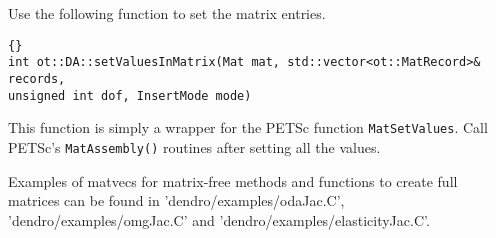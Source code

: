 \documentclass[12pt,reqno,a4paper]{report}
\numberwithin{equation}{section}
\begin{document}
Use the following function to set the matrix entries.

\begin{lstlisting}[frame=trbl, fontadjust]{}
int ot::DA::setValuesInMatrix(Mat mat, std::vector<ot::MatRecord>& records, 
unsigned int dof, InsertMode mode)
\end{lstlisting}

This function is simply a wrapper for the PETSc function \lstinline[basicstyle=\bfseries]!MatSetValues!. Call PETSc's \lstinline[basicstyle=\bfseries]!MatAssembly()! routines after setting all the values. 

Examples of matvecs for matrix-free methods and functions to create full matrices can be found in 'dendro/examples/odaJac.C', 'dendro/examples/omgJac.C' and 'dendro/examples/elasticityJac.C'. 
\end{document}
